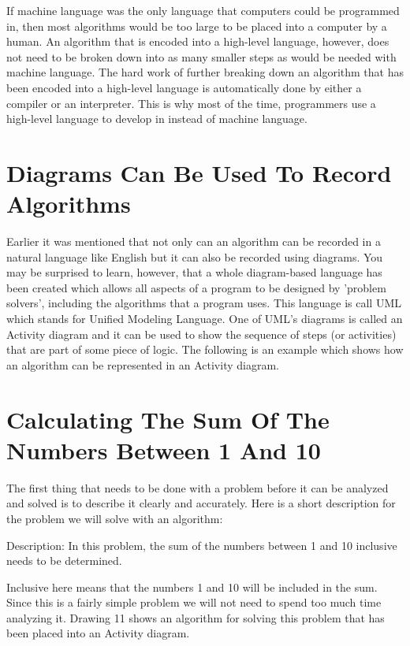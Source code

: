 \documentclass[12pt,oneside]{book}
\begin{document}
If machine language was the only language that computers could be programmed in, then most algorithms would be too large to be placed into a computer by a human. An algorithm that is encoded into a high{}-level language, however, does not need to be broken down into as many smaller steps as would be needed with machine language. The hard work of further breaking down an algorithm that has been encoded into a high{}-level language is automatically done by either a compiler or an interpreter. This is why most of the time, programmers use a high{}-level language to develop in instead of machine language.

\section[Diagrams Can Be Used To Record Algorithms]{ Diagrams Can Be Used To Record Algorithms}

Earlier it was mentioned that not only can an algorithm can be recorded in a natural language like English but it can also be recorded using diagrams. You may be surprised to learn, however, that a whole diagram{}-based language has been created which allows all aspects of a program to be designed by 'problem solvers', including the algorithms that a program uses. This language is call UML which stands for Unified Modeling Language. One of UML's diagrams is called an Activity diagram and it can be used to show the sequence of steps (or activities) that are part of some piece of logic. The following is an example which shows how an algorithm can be represented in an Activity diagram.

\section[Calculating The Sum Of The Numbers Between 1 And 10]{ Calculating The Sum Of The Numbers Between 1 And 10}

The first thing that needs to be done with a problem before it can be analyzed and solved is to describe it clearly and accurately. Here is a short description for the problem we will solve with an algorithm:


Description: In this problem, the sum of the numbers between 1 and 10 inclusive needs to be determined. 

Inclusive here means that the numbers 1 and 10 will be included in the sum. Since this is a fairly simple problem we will not need to spend too much time analyzing it. Drawing 11 shows an algorithm for solving this problem that has been placed into an Activity diagram. 
\end{document}
